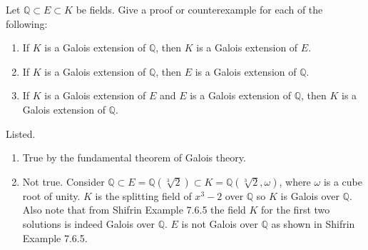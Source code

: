   \begin{exercise}[Shifrin 7.6.11]
    Let $\mathbb{Q} \subset E \subset K$ be fields. Give a proof or counterexample for each of the following:
    \begin{enumerate}[label=\alph*.]
      \item If $K$ is a Galois extension of $\mathbb{Q}$, then $K$ is a Galois extension of $E$.
      \item If $K$ is a Galois extension of $\mathbb{Q}$, then $E$ is a Galois extension of $\mathbb{Q}$.
      \item If $K$ is a Galois extension of $E$ and $E$ is a Galois extension of $\mathbb{Q}$, then $K$ is a Galois extension of $\mathbb{Q}$.
    \end{enumerate}
  \end{exercise}
  \begin{solution}
    Listed.  
    \begin{enumerate}
      \item True by the fundamental theorem of Galois theory. 

      \item Not true. Consider $\mathbb{Q} \subset E = \mathbb{Q}(\sqrt[3]{2}) \subset K = \mathbb{Q}(\sqrt[3]{2}, \omega)$, where $\omega$ is a cube root of unity. $K$ is the splitting field of $x^3 - 2$ over $\mathbb{Q}$ so $K$ is Galois over $\mathbb{Q}$. Also note that from Shifrin Example 7.6.5 the field $K$ for the first two solutions is indeed Galois over $\mathbb{Q}$. $E$ is not Galois over $\mathbb{Q}$ as shown in Shifrin Example 7.6.5. 


\end{enumerate}
\end{solution}
